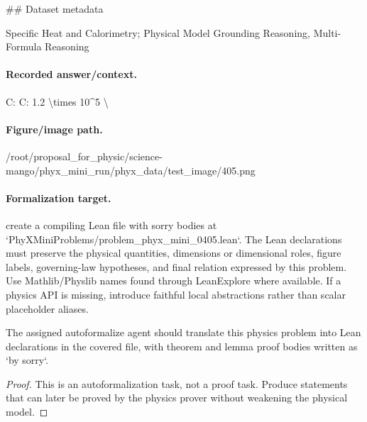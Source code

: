 \#\# Dataset metadata

Specific Heat and Calorimetry; Physical Model Grounding Reasoning, Multi-Formula Reasoning

\paragraph{Recorded answer/context.}
C: C: 1.2 \textbackslash{}times 10\textasciicircum{}5 \textbackslash{}

\paragraph{Figure/image path.}
/root/proposal\_for\_physic/science-mango/phyx\_mini\_run/phyx\_data/test\_image/405.png

\paragraph{Formalization target.}
create a compiling Lean file with sorry bodies at `PhyXMiniProblems/problem\_phyx\_mini\_0405.lean`. The Lean declarations must preserve the physical quantities, dimensions or dimensional roles, figure labels, governing-law hypotheses, and final relation expressed by this problem.
Use Mathlib/Physlib names found through LeanExplore where available. If a physics API is missing, introduce faithful local abstractions rather than scalar placeholder aliases.

\begin{theorem}
\label{thm:physics:phyx_mini_0405:target}
The assigned autoformalize agent should translate this physics problem into Lean declarations in the covered file, with theorem and lemma proof bodies written as `by sorry`.
\end{theorem}
\begin{proof}
This is an autoformalization task, not a proof task. Produce statements that can later be proved by the physics prover without weakening the physical model.
\end{proof}

